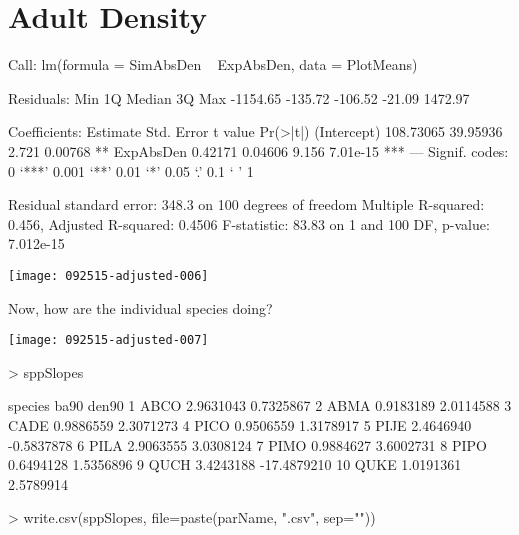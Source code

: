 \documentclass{article}
\begin{document}
\newpage

\section{Adult Density}
\begin{Schunk}
\begin{Soutput}
Call:
lm(formula = SimAbsDen ~ ExpAbsDen, data = PlotMeans)

Residuals:
     Min       1Q   Median       3Q      Max 
-1154.65  -135.72  -106.52   -21.09  1472.97 

Coefficients:
             Estimate Std. Error t value Pr(>|t|)    
(Intercept) 108.73065   39.95936   2.721  0.00768 ** 
ExpAbsDen     0.42171    0.04606   9.156 7.01e-15 ***
---
Signif. codes:  0 ‘***’ 0.001 ‘**’ 0.01 ‘*’ 0.05 ‘.’ 0.1 ‘ ’ 1

Residual standard error: 348.3 on 100 degrees of freedom
Multiple R-squared:  0.456,	Adjusted R-squared:  0.4506 
F-statistic: 83.83 on 1 and 100 DF,  p-value: 7.012e-15
\end{Soutput}
\end{Schunk}
\texttt{[image: 092515-adjusted-006]}

Now, how are the individual species doing?

\texttt{[image: 092515-adjusted-007]}
\begin{Schunk}
\begin{Sinput}
>   sppSlopes
\end{Sinput}
\begin{Soutput}
   species      ba90       den90
1     ABCO 2.9631043   0.7325867
2     ABMA 0.9183189   2.0114588
3     CADE 0.9886559   2.3071273
4     PICO 0.9506559   1.3178917
5     PIJE 2.4646940  -0.5837878
6     PILA 2.9063555   3.0308124
7     PIMO 0.9884627   3.6002731
8     PIPO 0.6494128   1.5356896
9     QUCH 3.4243188 -17.4879210
10    QUKE 1.0191361   2.5789914
\end{Soutput}
\begin{Sinput}
>     write.csv(sppSlopes, file=paste(parName, ".csv", sep=""))
\end{Sinput}
\end{Schunk}
\end{document}
